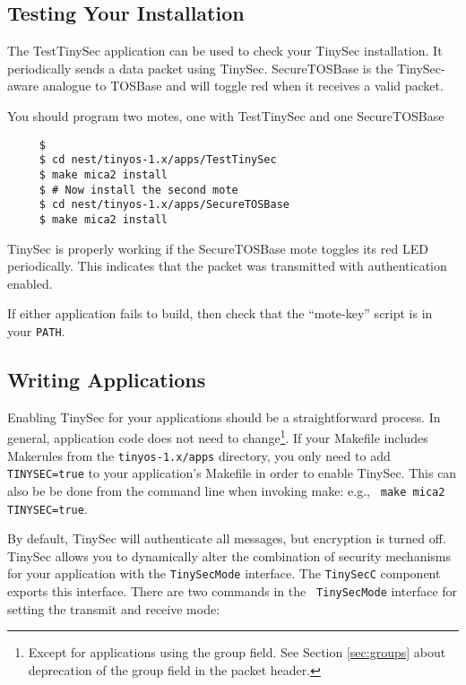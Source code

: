 \documentclass[11pt]{article}
\begin{document}
\subsection{Testing Your Installation}
The TestTinySec application can be used to check your TinySec installation. It
periodically sends a data packet using TinySec.  SecureTOSBase is the
TinySec-aware analogue to TOSBase and will toggle red when it receives
a valid packet. 

You should program two motes, one with TestTinySec and one
SecureTOSBase
\begin{verbatim}
     $
     $ cd nest/tinyos-1.x/apps/TestTinySec
     $ make mica2 install
     $ # Now install the second mote
     $ cd nest/tinyos-1.x/apps/SecureTOSBase
     $ make mica2 install
\end{verbatim}

TinySec is properly working if the SecureTOSBase mote toggles its red
LED periodically. This indicates that the packet was transmitted with
authentication enabled. 

If either application fails to build, then check that the ``mote-key'' script
is in your {\tt PATH}.  


\subsection{Writing Applications}
\label{sec:writing}
Enabling TinySec for your applications should be a straightforward process.  In
general, application code does not need to change\footnote{Except for
  applications using the group field. See Section \ref{sec:groups} about
  deprecation of the group field in the packet header.}.  If your Makefile
includes Makerules from the {\tt tinyos-1.x/apps} directory, you only need to
add {\tt TINYSEC=true} to your application's Makefile in order to enable
TinySec. This can also be be done from the command line when invoking make:
e.g., {\tt
  make mica2 TINYSEC=true}.

By default, TinySec will authenticate all messages, but encryption is turned
off. TinySec allows you to dynamically alter the combination of security
mechanisms for
your application with the {\tt TinySecMode} interface. The {\tt TinySecC}
component exports this interface. There are two commands in the {\tt
  TinySecMode} interface for setting the
transmit and receive mode:
\end{document}
